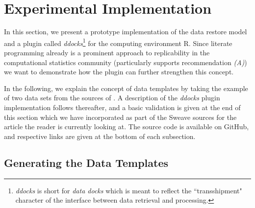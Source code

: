 \documentclass{sig-alternate}
\begin{document}
\section{Experimental Implementation}\label{sec:impl}

In this section, we present a prototype implementation of the data restore model and a plugin called \textit{ddocks}\footnote{\textit{ddocks} is short for \textit{data docks} which is meant to reflect the ``transshipment" character of the interface between data retrieval and processing.} 
for the computing environment R.
Since literate programming already is a prominent approach to replicability in the computational statistics community \cite{leisch2011executable} (particularly supports recommendation \textit{(A)}) we want to demonstrate how the plugin can further strengthen this concept.


In the following, we explain the concept of data templates by taking the example of two data sets from the sources of \cite{KoenkerZeileis2009}. 
A description of the \textit{ddocks} plugin implementation follows thereafter,
and a basic validation is given at the end of this section which we have incorporated as part of the Sweave sources for the article the reader is currently looking at.
The source code is available on GitHub, and respective links are given at the bottom of each subsection.



\subsection{Generating the Data Templates}
\end{document}
